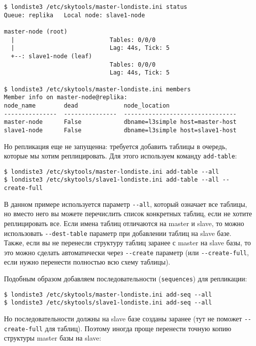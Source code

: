 \begin{lstlisting}[label=lst:londiste-replica13,caption=Статус кластера]
$ londiste3 /etc/skytools/master-londiste.ini status
Queue: replika   Local node: slave1-node

master-node (root)
  |                           Tables: 0/0/0
  |                           Lag: 44s, Tick: 5
  +--: slave1-node (leaf)
                              Tables: 0/0/0
                              Lag: 44s, Tick: 5

$ londiste3 /etc/skytools/master-londiste.ini members
Member info on master-node@replika:
node_name        dead             node_location
---------------  ---------------  --------------------------------
master-node      False            dbname=l3simple host=master-host
slave1-node      False            dbname=l3simple host=slave1-host
\end{lstlisting}

Но репликация еще не запущенна: требуется добавить таблицы в очередь, которые мы хотим реплицировать. Для этого используем команду \lstinline!add-table!:

\begin{lstlisting}[label=lst:londiste-replica13,caption=Добавляем таблицы]
$ londiste3 /etc/skytools/master-londiste.ini add-table --all
$ londiste3 /etc/skytools/slave1-londiste.ini add-table --all --create-full
\end{lstlisting}

В данном примере используется параметр \lstinline!--all!, который означает все таблицы, но вместо него вы можете перечислить список конкретных таблиц, если не хотите реплицировать все. Если имена таблиц отличаются на master и slave, то можно использовать \lstinline!--dest-table! параметр при добавлении таблиц на slave базе. Также, если вы не перенесли структуру таблиц заранее с master на slave базы, то это можно сделать автоматически через \lstinline!--create! параметр (или \lstinline!--create-full!, если нужно перенести полностью всю схему таблицы).

Подобным образом добавляем последовательности (\lstinline!sequences!) для репликации:

\begin{lstlisting}[label=lst:londiste-replica14,caption=Добавляем последовательности]
$ londiste3 /etc/skytools/master-londiste.ini add-seq --all
$ londiste3 /etc/skytools/slave1-londiste.ini add-seq --all
\end{lstlisting}

Но последовательности должны на slave базе созданы заранее (тут не поможет \lstinline!--create-full! для таблиц). Поэтому иногда проще перенести точную копию структуры master базы на slave:

